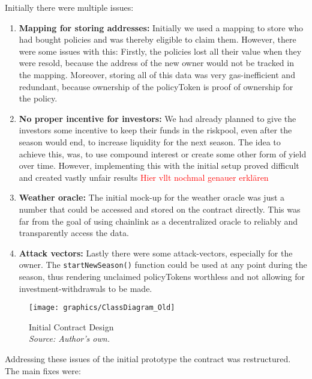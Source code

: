 \documentclass[11pt,a4paper]{article}
\begin{document}
	Initially there were multiple issues:
	\begin{enumerate}[1]
		\item \textbf{Mapping for storing addresses:} Initially we used a mapping to store who had bought policies and was thereby eligible to claim them.
			However, there were some issues with this: Firstly, the policies lost all their value when they were resold, because the address of the new owner would not be tracked in the mapping.
			Moreover, storing all of this data was very gas-inefficient and redundant, because ownership of the policyToken is proof of ownership for the policy.
		\item \textbf{No proper incentive for investors:} We had already planned to give the investors some incentive to keep their funds in the riskpool, even after the season would end, to increase liquidity for the next season.
			The idea to achieve this, was, to use compound interest or create some other form of yield over time.
			However, implementing this with the initial setup proved difficult and created vastly unfair results \textcolor{red}{Hier vllt nochmal genauer erkl\"aren}
		\item \textbf{Weather oracle:} The initial mock-up for the weather oracle was just a number that could be accessed and stored on the contract directly.
			This was far from the goal of using chainlink as a decentralized oracle to reliably and transparently access the data.
		\item \textbf{Attack vectors:} Lastly there were some attack-vectors, especially for the owner.
			The \texttt{startNewSeason()} function could be used at any point during the season, thus rendering unclaimed policyTokens worthless and not allowing for investment-withdrawals to be made.
	\end{enumerate}

	\begin{figure}[H]
		\centering
		\texttt{[image: graphics/ClassDiagram\_Old]}
		\caption{Initial Contract Design \\ \textit{Source: Author's own.}}
		\label{fig:initial-contract-design}
	\end{figure}

	Addressing these issues of the initial prototype the contract was restructured.
    The main fixes were:
\end{document}
